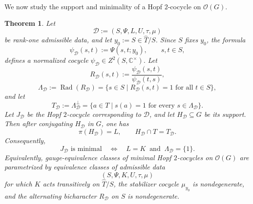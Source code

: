 \documentclass{amsart}
\newtheorem{theorem}{Theorem}[section]
\theoremstyle{definition}
\newcommand{\Rad}{\operatorname{Rad}}
\newcommand{\Ctimes}{\mathbb{C}^{\times}}
\numberwithin{equation}{section}
\begin{document}
We now study the support and minimality of a Hopf $2$-cocycle on $\mathscr O(G)$.

\begin{theorem}\label{prop:factorization}
Let
\[
 \mathcal D:=(S,\Psi,L,U,\tau,\mu)
\]
be rank-one admissible data, and let $y_0:=S\in \widehat{T}/S$.  Since $S$ fixes
$y_0$, the formula
\begin{equation}\label{eq:toral-isotropy-cocycle}
 \psi_{\mathcal D}(s,t):=\Psi(s,t;y_0),
 \qquad s,t\in S,
\end{equation}
defines a normalized cocycle $\psi_{\mathcal D}\in Z^2(S,\Ctimes)$.  Let
\[
 R_{\mathcal D}(s,t)
 :=\frac{\psi_{\mathcal D}(s,t)}{\psi_{\mathcal D}(t,s)},
 \] 
 \[
 \Lambda_{\mathcal D}
 :=\Rad(R_{\mathcal D})
 =\{s\in S\mid R_{\mathcal D}(s,t)=1\text{ for all }t\in S\},
\]
and let
\[
 T_{\mathcal D}:=\Lambda_{\mathcal D}^{\perp}
 =\{a\in T\mid s(a)=1\text{ for every }s\in\Lambda_{\mathcal D}\}.
\]
Let $J_{\mathcal D}$ be the Hopf $2$-cocycle corresponding to $\mathcal D$, and let
$H_{\mathcal D}\subseteq G$ be its support.  Then after conjugating
$H_{\mathcal D}$ in $G$, one has
\begin{equation}\label{eq:support-from-admissible-data}
 \pi(H_{\mathcal D})=L,
 \qquad
 H_{\mathcal D}\cap T=T_{\mathcal D}.
\end{equation}
Consequently,
\begin{equation}\label{eq:minimality-full-data}
 J_{\mathcal D}\text{ is minimal}
 \quad\Longleftrightarrow\quad
 L=K\ \text{ and }\ \Lambda_{\mathcal D}=\{1\}.
\end{equation}
Equivalently, gauge-equivalence classes of minimal Hopf $2$-cocycles on
$\mathscr O(G)$ are parametrized by equivalence classes of admissible data
\[
 (S,\Psi,K,U,\tau,\mu)
\]
for which $K$ acts transitively on $\widehat{T}/S$, the stabilizer cocycle $\mu_{y_0}$ is
nondegenerate, and the alternating bicharacter $R_{\mathcal D}$ on $S$ is
nondegenerate.
\end{theorem}
\end{document}
